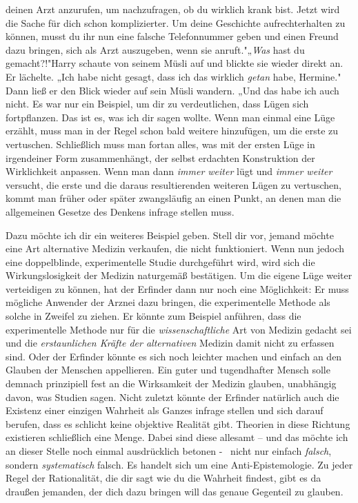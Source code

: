 {deinen Arzt anzurufen, um nachzufragen, ob du wirklich krank bist. Jetzt wird die Sache für dich schon komplizierter. Um deine Geschichte aufrechterhalten zu können, musst du ihr nun eine falsche Telefonnummer geben und einen Freund dazu bringen, sich als Arzt auszugeben, wenn sie anruft."„\emph{Was} hast du gemacht?!"Harry schaute von seinem Müsli auf und blickte sie wieder direkt an. Er lächelte. „Ich habe nicht gesagt, dass ich das wirklich \emph{getan} habe, Hermine." Dann ließ er den Blick wieder auf sein Müsli wandern. „Und das habe ich auch nicht. Es war nur ein Beispiel, um dir zu verdeutlichen, dass Lügen sich fortpflanzen. Das ist es, was ich dir sagen wollte. Wenn man einmal eine Lüge erzählt, muss man in der Regel schon bald weitere hinzufügen, um die erste zu vertuschen. Schließlich muss man fortan alles, was mit der ersten Lüge in irgendeiner Form zusammenhängt, der selbst erdachten Konstruktion der Wirklichkeit anpassen. Wenn man dann \emph{immer weiter} lügt und \emph{immer weiter} versucht, die erste und die daraus resultierenden weiteren Lügen zu vertuschen, kommt man früher oder später zwangsläufig an einen Punkt, an denen man die allgemeinen Gesetze des Denkens infrage stellen muss.

Dazu möchte ich dir ein weiteres Beispiel geben. Stell dir vor, jemand möchte eine Art alternative Medizin verkaufen, die nicht funktioniert. Wenn nun jedoch eine doppelblinde, experimentelle Studie durchgeführt wird, wird sich die Wirkungslosigkeit der Medizin naturgemäß bestätigen. Um die eigene Lüge weiter verteidigen zu können, hat der Erfinder dann nur noch eine Möglichkeit: Er muss mögliche Anwender der Arznei dazu bringen, die experimentelle Methode als solche in Zweifel zu ziehen. Er könnte zum Beispiel anführen, dass die experimentelle Methode nur für die \emph{wissenschaftliche} Art von Medizin gedacht sei und die \emph{erstaunlichen Kräfte der alternativen} Medizin damit nicht zu erfassen sind. Oder der Erfinder könnte es sich noch leichter machen und einfach an den Glauben der Menschen appellieren. Ein guter und tugendhafter Mensch solle demnach prinzipiell fest an die Wirksamkeit der Medizin glauben, unabhängig davon, was Studien sagen. Nicht zuletzt könnte der Erfinder natürlich auch die Existenz einer einzigen Wahrheit als Ganzes infrage stellen und sich darauf berufen, dass es schlicht keine objektive Realität gibt. Theorien in diese Richtung existieren schließlich eine Menge. Dabei sind diese allesamt -- und das möchte ich an dieser Stelle noch einmal ausdrücklich betonen - ~nicht nur einfach \emph{falsch}, sondern \emph{systematisch} falsch. Es handelt sich um eine Anti-Epistemologie. Zu jeder Regel der Rationalität, die dir sagt wie du die Wahrheit findest, gibt es da draußen jemanden, der dich dazu bringen will das genaue Gegenteil zu glauben.

}
